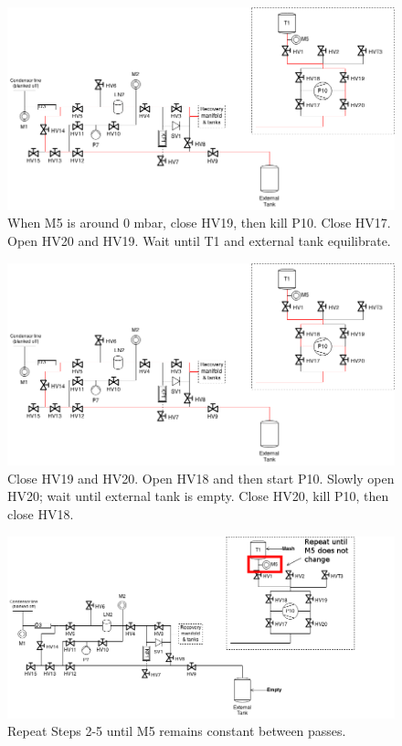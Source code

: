 \documentclass[a4paper,10pt]{article}
\begin{document}
\begin{figure}[htbp!]
 \centering
 \includegraphics[width=\textwidth]{./mash-cleaning-schematic-4-gas-to-t1.png}
 \caption{When M5 is around 0 mbar, close HV19, then kill P10.  Close HV17.  Open HV20 and HV19.  Wait until T1 and external tank equilibrate.}
 \label{d}
\end{figure}


\begin{figure}[htbp!]
 \centering
 \includegraphics[width=\textwidth]{./mash-cleaning-schematic-5-pump-gas-to-t1.png}
 \caption{Close HV19 and HV20.  Open HV18 and then start P10.  Slowly open HV20; wait until external tank is empty.  Close HV20, kill P10, then close HV18.}
 \label{e}
\end{figure}

\begin{figure}[htbp!]
 \centering
 \includegraphics[width=\textwidth]{./mash-cleaning-schematic-6-repeat.png}
 \caption{Repeat Steps 2-5 until M5 remains constant between passes.}
 \label{f}
\end{figure}
\end{document}
